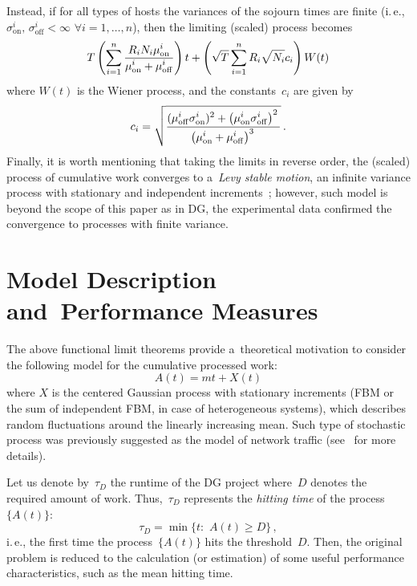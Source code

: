 \begin{multicols}{2}
Instead, if for all types of hosts the variances of the sojourn times 
are finite (i.\,e., $\sigma_{\mathrm{on}}^i,\,\sigma_{\mathrm{off}}^i<\infty$ 
$\forall i=1,\dots,n$), then the limiting (scaled) process becomes
\begin{equation*}
T\left( \sum\limits_{i=1}^n \displaystyle\frac{\displaystyle R_i N_i \mu_{\mathrm{on}}^i\mathstrut}{\displaystyle \mu_{\mathrm{on}}^i+\mu_{\mathrm{off}}^i\mathstrut}
\right)t + \left(\sqrt{T}\sum\limits_{i=1}^n R_i \sqrt{N_i}c_i \right)W(t)
\end{equation*}
where $W(t)$ is the Wiener process, and the constants~$c_i$ are given by
$$
c_i = \sqrt{ \displaystyle\frac{\displaystyle  (\mu_{\mathrm{off}}^i\sigma_{\mathrm{on}}^i)^2 + 
\left(\mu_{\mathrm{on}}^i\sigma_{\mathrm{off}}^i\right)^2 \mathstrut}{\displaystyle \left(\mu_{\mathrm{on}}^i+\mu_{\mathrm{off}}^i\right)^3\mathstrut}}\,.
$$
Finally, it is worth mentioning that taking the limits in reverse order, 
the (scaled) process of cumulative work converges to a~\textit{Levy stable motion}, 
an infinite variance process with stationary and independent increments~\cite{14-luk-1}; 
however, such  model is beyond the scope of this paper as in DG, the experimental 
data confirmed the convergence to processes with finite variance.


\section{Model Description and~Performance Measures}


\noindent
The above functional limit theorems provide a~theoretical motivation to 
consider the following model for the cumulative processed work: 
\begin{equation}
    A(t) = m t + X(t)
    \label{6}
\end{equation}
where $X$ is the centered Gaussian process with stationary increments 
(FBM or the sum of independent FBM, in case of heterogeneous systems),
 which describes random fluctuations around the linearly  increasing mean. 
 Such type of stochastic process was previously suggested as the model of 
 network traffic (see~\cite{15-luk-1} for more details). 


Let us denote  by~$\tau_D$ the  runtime of the  DG project where~$D$ 
denotes the required amount of work. Thus,~$\tau_D$ represents the  
\textit{hitting time} of  the process~$\{A(t)\}$:  
\begin{equation*}
\tau_D = \min\{t:\,\, A(t)\ge D \} \, ,
\end{equation*}
i.\,e., the first time the process~$\{A(t)\}$ hits the threshold~$D$.
Then, the original problem is reduced to the calculation (or estimation)
 of some useful performance characteristics, such as the mean  hitting time.


\end{multicols}
